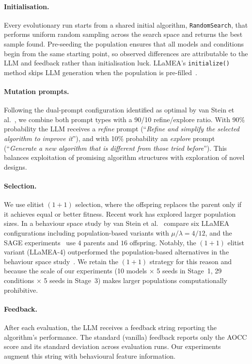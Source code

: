 \paragraph{Initialisation.}
Every evolutionary run starts from a shared initial algorithm, \texttt{RandomSearch}, that performs uniform random sampling across the search space and returns the best sample found. Pre-seeding the population ensures that all models and conditions begin from the same starting point, so observed differences are attributable to the LLM and feedback rather than initialisation luck. LLaMEA's \texttt{initialize()} method skips LLM generation when the population is pre-filled~\cite{vanStein2024LLaMEA}.

\paragraph{Mutation prompts.}
Following the dual-prompt configuration identified as optimal by van Stein et al.~\cite{vanStein2025Behaviour}, we combine both prompt types with a 90/10 refine/explore ratio. With 90\% probability the LLM receives a \emph{refine} prompt (``\textit{Refine and simplify the selected algorithm to improve it}''), and with 10\% probability an \emph{explore} prompt (``\textit{Generate a new algorithm that is different from those tried before}''). This balances exploitation of promising algorithm structures with exploration of novel designs.

\paragraph{Selection.}
We use elitist $(1+1)$ selection, where the offspring replaces the parent only if it achieves equal or better fitness. Recent work has explored larger population sizes. In a behaviour space study by van Stein et al.~\cite{vanStein2025Behaviour} compare six LLaMEA configurations including population-based variants with $\mu/\lambda = 4/12$, and the SAGE experiments~\cite{vanStein2026LLaMEASAGE} use $4$ parents and $16$ offspring. Notably, the $(1+1)$ elitist variant (LLaMEA-4) outperformed the population-based alternatives in the behaviour space study~\cite{vanStein2025Behaviour}. We retain the $(1+1)$ strategy for this reason and because the scale of our experiments (10 models $\times$ 5 seeds in Stage~1, 29 conditions $\times$ 5 seeds in Stage~3) makes larger populations computationally prohibitive.

\paragraph{Feedback.}
After each evaluation, the LLM receives a feedback string reporting the algorithm's performance. The standard (vanilla) feedback reports only the AOCC score and its standard deviation across evaluation runs. Our experiments augment this string with behavioural feature information.

